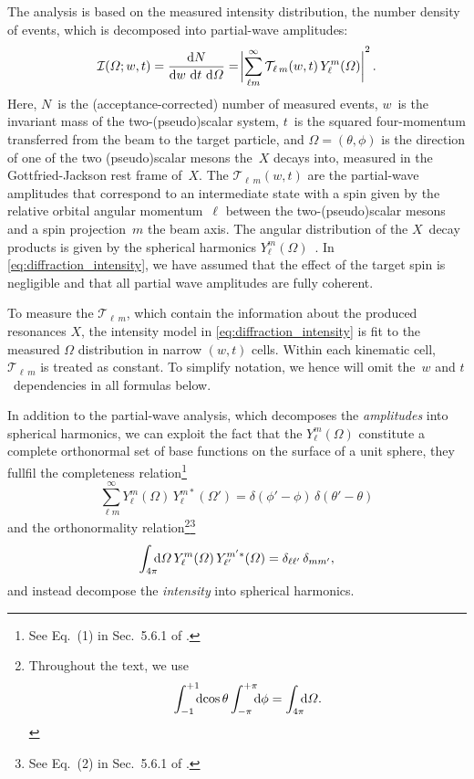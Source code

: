 The analysis is based on the measured intensity distribution, \ie the
number density of events, which is decomposed into partial-wave
amplitudes:
\begin{equation}
  \label{eq:diffraction_intensity}
  \mathcal{I}(\Omega; w, t)
  = \frac{\dif{N}}{\dif{w}\, \dif{t}\, \dif{\Omega}}
  = \Abs[3]{\sum_{\ell m}^\infty \mathcal{T\!}_{\ell\, m}(w, t)\, Y_\ell^m(\Omega)}^2.
\end{equation}
Here, $N$~is the (acceptance-corrected) number of measured events,
$w$~is the invariant mass of the two-(pseudo)scalar system, $t$~is the
squared four-momentum transferred from the beam to the target
particle, and $\Omega = (\theta, \phi)$ is the direction of one of the
two (pseudo)scalar mesons the~$X$ decays into, measured in the
Gottfried-Jackson rest frame of~$X$.  The $\mathcal{T\!}_{\ell\, m}(w,
t)$ are the partial-wave amplitudes that correspond to an intermediate
state with a spin given by the relative orbital angular
momentum~$\ell$ between the two-(pseudo)scalar mesons and a spin
projection~$m$ \wrt the beam axis.  The angular distribution of the
$X$~decay products is given by the spherical harmonics
$Y_\ell^m(\Omega)$~\cite{wikipedia:sphericalHarm}.  In
\cref{eq:diffraction_intensity}, we have assumed that the effect of
the target spin is negligible and that all partial wave amplitudes are
fully coherent.

To measure the $\mathcal{T\!}_{\ell\, m}$, which contain the information
about the produced resonances $X$, the intensity model in
\cref{eq:diffraction_intensity} is fit to the measured $\Omega$
distribution in narrow $(w, t)$ cells.  Within each kinematic cell,
$\mathcal{T\!}_{\ell\, m}$ is treated as constant.  To simplify notation,
we hence will omit the~$w$ and $t$~dependencies in all formulas below.

In addition to the partial-wave analysis, which decomposes the
\emph{amplitudes} into spherical harmonics, we can exploit the fact
that the $Y_\ell^m(\Omega)$ constitute a complete orthonormal set of
base functions on the surface of a unit sphere, \ie they fullfil the
completeness relation\footnote{See Eq.~(1) in Sec.~5.6.1 of
.}
\begin{equation}
  \label{eq:spherical_harm_complete}
  \sum_{\ell m}^\infty Y_\ell^m(\Omega)\, Y_\ell^{m *}(\Omega')
  = \delta(\phi' - \phi)\, \delta(\theta' - \theta)
\end{equation}
and the orthonormality relation\footnote{%
Throughout the text, we use
\begin{equation}
  \int_{-1}^{+1}\!\!\! \dif{\cos\theta} \int_{-\pi}^{+\pi}\!\!\! \dif{\phi}
  = \int_{4 \pi}\!\!\! \dif{\Omega}.
\end{equation}
}\footnote{See Eq.~(2) in Sec.~5.6.1 of
.}
\begin{equation}
  \label{eq:spherical_harm_orthonorm}
  \int_{4 \pi}\!\!\! \dif{\Omega}\, Y_\ell^m(\Omega)\, Y_{\ell'}^{m' *}(\Omega)
  = \delta_{\ell \ell'}\, \delta_{m m'},
\end{equation}
and instead decompose the \emph{intensity} into spherical harmonics.

